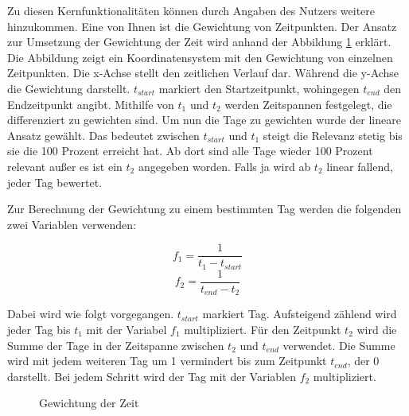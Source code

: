 Zu diesen Kernfunktionalitäten können durch Angaben des Nutzers weitere hinzukommen. Eine von Ihnen ist die Gewichtung von Zeitpunkten. Der Ansatz zur Umsetzung der Gewichtung der Zeit wird anhand der Abbildung \ref{fig:umsetzung:gewichtungderzeit} erklärt. Die Abbildung zeigt ein Koordinatensystem mit den Gewichtung von einzelnen Zeitpunkten. Die x-Achse stellt den zeitlichen Verlauf dar. Während die y-Achse die Gewichtung darstellt. $t_{start}$ markiert den Startzeitpunkt, wohingegen $t_{end}$ den Endzeitpunkt angibt. Mithilfe von $t_1$ und $t_2$ werden Zeitspannen festgelegt, die differenziert zu gewichten sind. Um nun die Tage zu gewichten wurde der lineare Ansatz gewählt. Das bedeutet zwischen $t_{start}$ und $t_1$ steigt die Relevanz stetig bis sie die 100 Prozent erreicht hat. Ab dort sind alle Tage wieder 100 Prozent relevant außer es ist ein $t_2$ angegeben worden. Falls ja wird ab $t_2$ linear fallend, jeder Tag bewertet. 

Zur Berechnung der Gewichtung zu einem bestimmten Tag werden die folgenden zwei Variablen verwenden:

\begin{equation}
f_1 = \frac{1}{t_1 - t_{start}}
\end{equation}
\begin{equation}
f_2 = \frac{1}{t_{end} - t_2}
\end{equation}

Dabei wird wie folgt vorgegangen. $t_{start}$ markiert Tag. Aufsteigend zählend wird jeder Tag bis $t_1$ mit der Variabel $f_1$ multipliziert. Für den Zeitpunkt $t_2$ wird die Summe der Tage in der Zeitspanne zwischen $t_2$ und $t_{end}$ verwendet. Die Summe wird mit jedem weiteren Tag um 1 vermindert bis zum Zeitpunkt $t_{end}$, der 0 darstellt. Bei jedem Schritt wird der Tag mit der Variablen $f_2$ multipliziert.

\begin{figure}[htbp]
\begin{center}
\end{center}
\caption{Gewichtung der Zeit}
\label{fig:umsetzung:gewichtungderzeit}
\end{figure}

